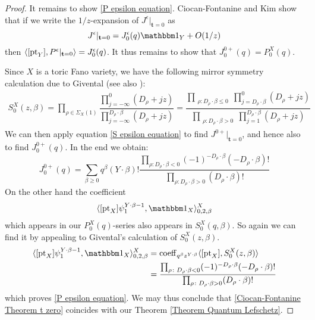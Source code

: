\begin{proof}
It remains to show \eqref{P epsilon equation}. Ciocan-Fontanine and Kim  show that if we write the $1/z$-expansion of ${J^{\epsilon}}|_{\mathbf{t}=0}$ as
\begin{equation*} {J^{\epsilon}}|_{\mathbf{t}=0}=J^{\epsilon}_{0}(q)\mathbbm 1_Y+O(1/z) \end{equation*}
then $\langle [\operatorname{pt}_Y],  P^\epsilon|_{{\bf t}=0}\rangle=J^{\epsilon}_{0}(q)$. It thus remains to show that $J^{0+}_0(q)=P_0^X(q)$.

Since $X$ is a toric Fano variety, we have the following mirror symmetry calculation due to Givental \cite{Givental-equivariantGW} (see also \cite[Definition 7.2.8]{CF-K}):
\begin{align*}
S_0^X(z,\beta) =\prod_{\rho\in\Sigma_X(1)}\dfrac{\prod_{j=-\infty}^0(D_{\rho}+jz)}{\prod_{j=-\infty}^{D_{\rho}\cdot \beta}(D_\rho+jz)}
=\dfrac{\prod_{\substack{\rho \colon D_\rho \cdot \beta\leq 0}} \prod_{j=D_\rho \cdot \beta}^0 (D_{\rho}+jz)}{\prod_{\substack{\rho\colon D_\rho \cdot\beta > 0}} \prod_{j=1}^{D_\rho\cdot\beta} (D_{\rho}+jz)}
\end{align*}
We can then apply equation \eqref{S epsilon equation} to find $J^{0+}|_{\mathbf{t}=0}$, and hence also to find $J^{0+}_0(q)$. In the end we obtain:
\begin{equation*}
 J^{0+}_0(q)=\sum_{\beta\geq 0}q^\beta(Y\cdot\beta)!\frac{\prod_{\rho\colon D_\rho\cdot\beta< 0}(-1)^{-D_{\rho}\cdot\beta}(-D_{\rho}\cdot\beta)!}{\prod_{\rho\colon D_\rho\cdot\beta> 0}(D_{\rho}\cdot\beta)!}
\end{equation*}
On the other hand the coefficient
\begin{equation*} \langle[\pt_X]\psi_1^{Y\cdot\beta-1},\mathbbm 1_X\rangle_{0,2,\beta}^X\end{equation*}
which appears in our $P_0^X(q)$-series also appears in $S_0^X(q,\beta)$. So again we can find it by appealing to Givental's calculation of $S_0^X(z,\beta)$.
\begin{align*}
 \langle[\pt_X]\psi_1^{Y\cdot\beta-1},\mathbbm 1_X\rangle_{0,2,\beta}^X &=\operatorname{coeff}_{q^\beta z^{Y\cdot\beta}}\langle [\pt_X],S_0^X(z,\beta) \rangle\\
& =\frac{\prod_{\rho\colon D_\rho\cdot\beta< 0}(-1)^{-D_{\rho}\cdot\beta}(-D_{\rho}\cdot\beta)!}{\prod_{\rho\colon D_\rho\cdot\beta> 0}(D_{\rho}\cdot\beta)!}
\end{align*}
which proves \eqref{P epsilon equation}. We may thus conclude that \eqref{Ciocan-Fontanine Theorem t zero} coincides with our Theorem \ref{Theorem Quantum Lefschetz}. \end{proof}